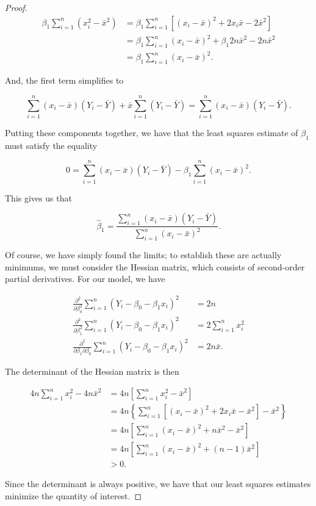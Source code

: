 \documentclass[
  letterpaper,
  DIV=11,
  numbers=noendperiod]{scrreprt}
\theoremstyle{plain}
\theoremstyle{definition}
\theoremstyle{definition}
\theoremstyle{remark}
\begin{document}
\begin{proof}
\[
\begin{aligned}
  \beta_1 \sum_{i=1}^{n} \left(x_i^2 - \bar{x}^2\right)
    &= \beta_1 \sum_{i=1}^{n} \left[\left(x_i - \bar{x}\right)^2 + 2x_i\bar{x} - 2\bar{x}^2\right] \\
    &= \beta_1\sum_{i=1}^{n}\left(x_i - \bar{x}\right)^2 + \beta_1 2 n\bar{x}^2 - 2n\bar{x}^2 \\
    &= \beta_1 \sum_{i=1}^{n} \left(x_i - \bar{x}\right)^2.
\end{aligned}
\]

And, the first term simplifies to

\[\sum_{i=1}^{n} \left(x_i - \bar{x}\right)\left(Y_i - \bar{Y}\right) + \bar{x} \sum_{i=1}^{n} \left(Y_i - \bar{Y}\right) = \sum_{i=1}^{n} \left(x_i - \bar{x}\right)\left(Y_i - \bar{Y}\right).\]

Putting these components together, we have that the least squares
estimate of \(\beta_1\) must satisfy the equality

\[0 = \sum_{i=1}^{n} \left(x_i - \bar{x}\right)\left(Y_i - \bar{Y}\right) - \beta_1 \sum_{i=1}^{n} \left(x_i - \bar{x}\right)^2.\]

This gives us that

\[\widehat{\beta}_1 = \frac{\sum_{i=1}^{n} \left(x_i - \bar{x}\right)\left(Y_i - \bar{Y}\right)}{\sum_{i=1}^{n} \left(x_i - \bar{x}\right)^2}.\]

Of course, we have simply found the limits; to establish these are
actually minimums, we must consider the Hessian matrix, which consists
of second-order partial derivatives. For our model, we have

\[
\begin{aligned}
  \frac{\partial^2}{\partial \beta_0^2} \sum_{i=1}^{n} \left(Y_i - \beta_0 - \beta_1 x_i\right)^2
    &= 2n \\
  \frac{\partial^2}{\partial \beta_1^2} \sum_{i=1}^{n} \left(Y_i - \beta_0 - \beta_1 x_i\right)^2
    &= 2\sum_{i=1}^{n} x_i^2\\
  \frac{\partial^2}{\partial \beta_1 \partial \beta_0} \sum_{i=1}^{n} \left(Y_i - \beta_0 - \beta_1 x_i\right)^2  
    &= 2n\bar{x}.
\end{aligned}
\]

The determinant of the Hessian matrix is then

\[
\begin{aligned}
  4n\sum_{i=1}^{n} x_i^2 - 4n\bar{x}^2 
    &= 4n\left[\sum_{i=1}^{n} x_i^2 - \bar{x}^2\right] \\
    &= 4n\left\{\sum_{i=1}^{n} \left[\left(x_i - \bar{x}\right)^2 + 2x_i\bar{x} - \bar{x}^2\right] - \bar{x}^2\right\} \\
    &= 4n \left[\sum_{i=1}^{n} \left(x_i - \bar{x}\right)^2 + n\bar{x}^2 - \bar{x}^2\right] \\
    &= 4n \left[\sum_{i=1}^{n} \left(x_i - \bar{x}\right)^2 + (n - 1)\bar{x}^2\right] \\
    &> 0.
\end{aligned}
\]

Since the determinant is always positive, we have that our least squares
estimates minimize the quantity of interest.

\end{proof}
\end{document}
